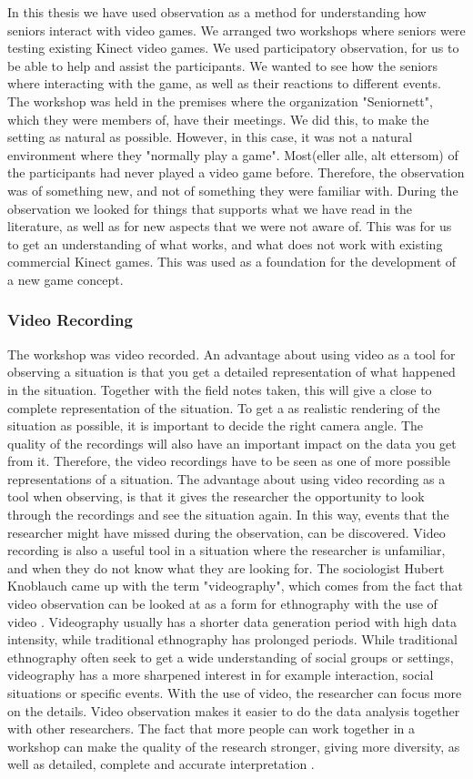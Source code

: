 In this thesis we have used observation as a method for understanding how seniors interact with video games. We arranged two workshops where seniors were testing existing Kinect video games. We used participatory observation, for us to be able to help and assist the participants. We wanted to see how the seniors where interacting with the game, as well as their reactions to different events. The workshop was held in the premises where the organization "Seniornett", which they were members of, have their meetings. We did this, to make the setting as natural as possible.  However, in this case, it was not a natural environment where they "normally play a game". Most(eller alle, alt ettersom) of the participants had never played a video game before. Therefore, the observation was of something new, and not of something they were familiar with. During the observation we looked for things that supports what we have read in the literature, as well as for new aspects that we were not aware of. This was for us to get an understanding of what works, and what does not work with existing commercial Kinect games. This was used as a foundation for the development of a new game concept. 

\subsubsection{Video Recording}
The workshop was video recorded. An advantage about using video as a tool for observing a situation is that you get a detailed representation of what happened in the situation. Together with the field notes taken, this will give a close to complete representation of the situation. To get a as realistic rendering of the situation as possible, it is important to decide the right camera angle. The quality of the recordings will also have an important impact on the data you get from it. Therefore, the video recordings have to be seen as one of more possible representations of a situation.  The advantage about using video recording as a tool when observing, is that it gives the researcher the opportunity to look through the recordings and see the situation again. In this way, events that the researcher might have missed during the observation, can be discovered. Video recording is also a useful tool in a situation where the researcher is unfamiliar, and when they do not know what they are looking for. The sociologist Hubert Knoblauch came up with the term "videography", which comes from the fact that video observation can be looked at as a form for ethnography with the use of video \cite{tjora}. Videography usually has a shorter data generation period with high data intensity, while traditional ethnography has prolonged periods.  While traditional ethnography often seek to get a wide understanding of social groups or settings, videography has a more sharpened interest in for example interaction, social situations or specific events. With the use of video, the researcher can focus more on the details. Video observation makes it easier to do the data analysis together with other researchers. The fact that more people can work together in a workshop can make the quality of the research stronger, giving more diversity, as well as detailed, complete and accurate interpretation \cite{tjora}.

